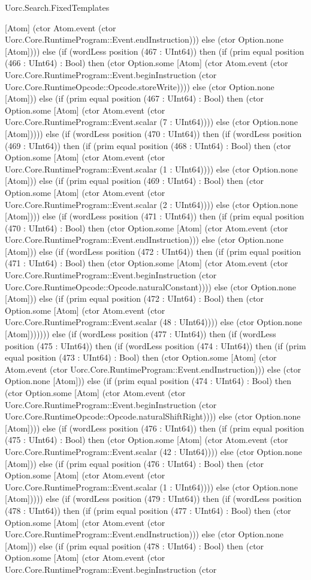 \begin{lexlean}{Uorc.Search.FixedTemplates}
\begin{semanticmodule}
{[Atom] (ctor Atom.event (ctor Uorc.Core.RuntimeProgram::Event.endInstruction))) else (ctor Option.none [Atom]))) else (if (wordLess position (467 : UInt64)) then (if (prim equal position (466 : UInt64) : Bool) then (ctor Option.some [Atom] (ctor Atom.event (ctor Uorc.Core.RuntimeProgram::Event.beginInstruction (ctor Uorc.Core.RuntimeOpcode::Opcode.storeWrite)))) else (ctor Option.none [Atom])) else (if (prim equal position (467 : UInt64) : Bool) then (ctor Option.some [Atom] (ctor Atom.event (ctor Uorc.Core.RuntimeProgram::Event.scalar (7 : UInt64)))) else (ctor Option.none [Atom])))) else (if (wordLess position (470 : UInt64)) then (if (wordLess position (469 : UInt64)) then (if (prim equal position (468 : UInt64) : Bool) then (ctor Option.some [Atom] (ctor Atom.event (ctor Uorc.Core.RuntimeProgram::Event.scalar (1 : UInt64)))) else (ctor Option.none [Atom])) else (if (prim equal position (469 : UInt64) : Bool) then (ctor Option.some [Atom] (ctor Atom.event (ctor Uorc.Core.RuntimeProgram::Event.scalar (2 : UInt64)))) else (ctor Option.none [Atom]))) else (if (wordLess position (471 : UInt64)) then (if (prim equal position (470 : UInt64) : Bool) then (ctor Option.some [Atom] (ctor Atom.event (ctor Uorc.Core.RuntimeProgram::Event.endInstruction))) else (ctor Option.none [Atom])) else (if (wordLess position (472 : UInt64)) then (if (prim equal position (471 : UInt64) : Bool) then (ctor Option.some [Atom] (ctor Atom.event (ctor Uorc.Core.RuntimeProgram::Event.beginInstruction (ctor Uorc.Core.RuntimeOpcode::Opcode.naturalConstant)))) else (ctor Option.none [Atom])) else (if (prim equal position (472 : UInt64) : Bool) then (ctor Option.some [Atom] (ctor Atom.event (ctor Uorc.Core.RuntimeProgram::Event.scalar (48 : UInt64)))) else (ctor Option.none [Atom])))))) else (if (wordLess position (477 : UInt64)) then (if (wordLess position (475 : UInt64)) then (if (wordLess position (474 : UInt64)) then (if (prim equal position (473 : UInt64) : Bool) then (ctor Option.some [Atom] (ctor Atom.event (ctor Uorc.Core.RuntimeProgram::Event.endInstruction))) else (ctor Option.none [Atom])) else (if (prim equal position (474 : UInt64) : Bool) then (ctor Option.some [Atom] (ctor Atom.event (ctor Uorc.Core.RuntimeProgram::Event.beginInstruction (ctor Uorc.Core.RuntimeOpcode::Opcode.naturalShiftRight)))) else (ctor Option.none [Atom]))) else (if (wordLess position (476 : UInt64)) then (if (prim equal position (475 : UInt64) : Bool) then (ctor Option.some [Atom] (ctor Atom.event (ctor Uorc.Core.RuntimeProgram::Event.scalar (42 : UInt64)))) else (ctor Option.none [Atom])) else (if (prim equal position (476 : UInt64) : Bool) then (ctor Option.some [Atom] (ctor Atom.event (ctor Uorc.Core.RuntimeProgram::Event.scalar (1 : UInt64)))) else (ctor Option.none [Atom])))) else (if (wordLess position (479 : UInt64)) then (if (wordLess position (478 : UInt64)) then (if (prim equal position (477 : UInt64) : Bool) then (ctor Option.some [Atom] (ctor Atom.event (ctor Uorc.Core.RuntimeProgram::Event.endInstruction))) else (ctor Option.none [Atom])) else (if (prim equal position (478 : UInt64) : Bool) then (ctor Option.some [Atom] (ctor Atom.event (ctor Uorc.Core.RuntimeProgram::Event.beginInstruction (ctor }
\end{semanticmodule}
\end{lexlean}
